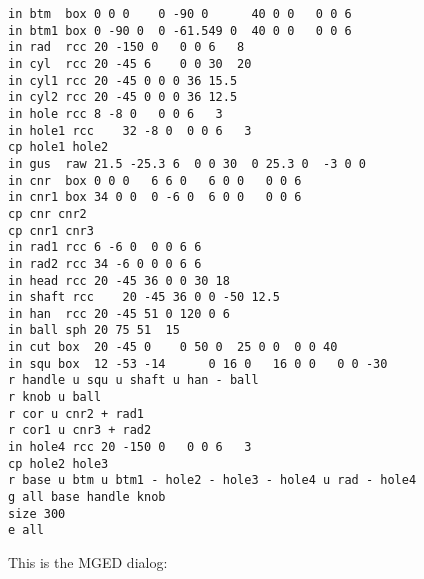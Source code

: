 \begin{verbatim}
in btm	box	0 0 0    0 -90 0      40 0 0   0 0 6
in btm1	box	0 -90 0  0 -61.549 0  40 0 0   0 0 6
in rad	rcc	20 -150 0   0 0 6   8
in cyl	rcc	20 -45 6    0 0 30  20
in cyl1 rcc	20 -45 0 0 0 36 15.5
in cyl2 rcc	20 -45 0 0 0 36 12.5
in hole rcc	8 -8 0   0 0 6   3 
in hole1 rcc	32 -8 0  0 0 6   3
cp hole1 hole2
in gus	raw	21.5 -25.3 6  0 0 30  0 25.3 0  -3 0 0
in cnr	box	0 0 0	6 6 0	6 0 0	0 0 6
in cnr1	box	34 0 0	0 -6 0	6 0 0	0 0 6
cp cnr cnr2
cp cnr1 cnr3
in rad1 rcc	6 -6 0	0 0 6 6
in rad2 rcc	34 -6 0	0 0 6 6 
in head rcc	20 -45 36 0 0 30 18
in shaft rcc	20 -45 36 0 0 -50 12.5
in han	rcc	20 -45 51 0 120 0 6
in ball sph	20 75 51  15
in cut box	20 -45 0	0 50 0	25 0 0	0 0 40
in squ box	12 -53 -14  	0 16 0   16 0 0   0 0 -30
r handle u squ u shaft u han - ball
r knob u ball
r cor u cnr2 + rad1
r cor1 u cnr3 + rad2
in hole4 rcc 20 -150 0   0 0 6   3
cp hole2 hole3
r base u btm u btm1 - hole2 - hole3 - hole4 u rad - hole4
g all base handle knob
size 300
e all
\end{verbatim}

This is the MGED dialog:

